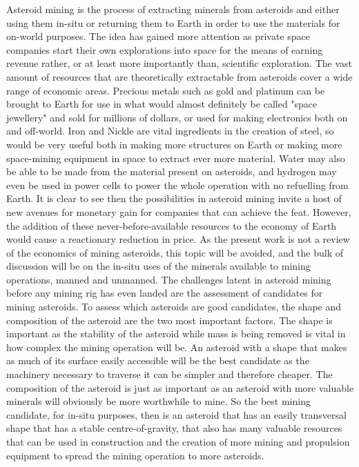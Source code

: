 \documentclass[10pt,twocolumn]{revtex4}    %
\begin{document}
Asteroid mining is the process of extracting minerals from asteroids and either using them in-situ or returning them to Earth in order to use the materials for on-world purposes. The idea has gained more attention as private space companies start their own explorations into space for the means of earning revenue rather, or at least more importantly than, scientific exploration. 
The vast amount of resources that are theoretically extractable from asteroids cover a wide range of economic areas. Precious metals such as gold and platinum can be brought to Earth for use in what would almost definitely be called "space jewellery" and sold for millions of dollars, or used for making electronics both on and off-world. Iron and Nickle are vital ingredients in the creation of steel, so would be very useful both in making more structures on Earth or making more space-mining equipment in space to extract ever more material. Water may also be able to be made from the material present on asteroids, and hydrogen may even be used in power cells to power the whole operation with no refuelling from Earth. 
It is clear to see then the possibilities in asteroid mining invite a host of new avenues for monetary gain for companies that can achieve the feat. However, the addition of these never-before-available resources to the economy of Earth would cause a reactionary reduction in price. As the present work is not a review of the economics of mining asteroids, this topic will be avoided, and the bulk of discussion will be on the in-situ uses of the minerals available to mining operations, manned and unmanned.  
The challenges latent in asteroid mining before any mining rig has even landed are the assessment of candidates for mining asteroids. To assess which asteroids are good candidates, the shape and composition of the asteroid are the two most important factors. 
The shape is important as the stability of the asteroid while mass is being removed is vital in how complex the mining operation will be. An asteroid with a shape that makes as much of its surface easily accessible will be the best candidate as the machinery necessary to traverse it can be simpler and therefore cheaper.
The composition of the asteroid is just as important as an asteroid with more valuable minerals will obviously be more worthwhile to mine.
So the best mining candidate, for in-situ purposes, then is an asteroid that has an easily transversal shape that has a stable centre-of-gravity, that also has many valuable resources that can be used in construction and the creation of more mining and propulsion equipment to spread the mining operation to more asteroids. 
\end{document}
